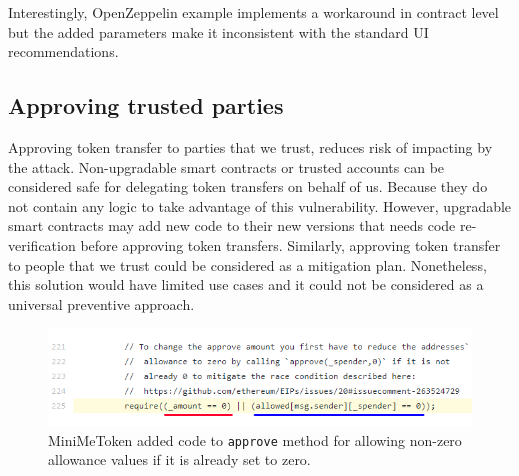  Interestingly, OpenZeppelin example implements a workaround in contract level but the added parameters make it inconsistent with the standard UI recommendations.



\subsection{Approving trusted parties}
Approving token transfer to parties that we trust, reduces risk of impacting by the attack. Non-upgradable smart contracts or trusted accounts can be considered safe for delegating token transfers on behalf of us. Because they do not contain any logic to take advantage of this vulnerability. However, upgradable smart contracts may add new code to their new versions that needs code re-verification before approving token transfers. Similarly, approving token transfer to people that we trust could be considered as a mitigation plan. Nonetheless, this solution would have limited use cases and it could not be considered as a universal preventive approach.

\begin{figure}[t]
	\centering
	\includegraphics[width=1.0\linewidth]{figures/multiple_withdrawal_06.png}
	\caption{MiniMeToken added code to \texttt{approve} method for allowing non-zero allowance values if it is already set to zero.\label{fig:mini}}
\end{figure}

